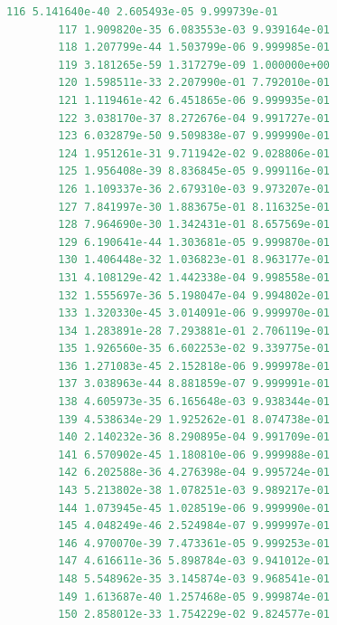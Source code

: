 \documentclass[12pt, a4paper, oneside]{ctexart}
\begin{document}
\begin{appendices}
\begin{lstlisting}[language=R, caption={训练好的模型对鸢尾花数据集的预测结果}, label=predictIris]
		116 5.141640e-40 2.605493e-05 9.999739e-01
		117 1.909820e-35 6.083553e-03 9.939164e-01
		118 1.207799e-44 1.503799e-06 9.999985e-01
		119 3.181265e-59 1.317279e-09 1.000000e+00
		120 1.598511e-33 2.207990e-01 7.792010e-01
		121 1.119461e-42 6.451865e-06 9.999935e-01
		122 3.038170e-37 8.272676e-04 9.991727e-01
		123 6.032879e-50 9.509838e-07 9.999990e-01
		124 1.951261e-31 9.711942e-02 9.028806e-01
		125 1.956408e-39 8.836845e-05 9.999116e-01
		126 1.109337e-36 2.679310e-03 9.973207e-01
		127 7.841997e-30 1.883675e-01 8.116325e-01
		128 7.964690e-30 1.342431e-01 8.657569e-01
		129 6.190641e-44 1.303681e-05 9.999870e-01
		130 1.406448e-32 1.036823e-01 8.963177e-01
		131 4.108129e-42 1.442338e-04 9.998558e-01
		132 1.555697e-36 5.198047e-04 9.994802e-01
		133 1.320330e-45 3.014091e-06 9.999970e-01
		134 1.283891e-28 7.293881e-01 2.706119e-01
		135 1.926560e-35 6.602253e-02 9.339775e-01
		136 1.271083e-45 2.152818e-06 9.999978e-01
		137 3.038963e-44 8.881859e-07 9.999991e-01
		138 4.605973e-35 6.165648e-03 9.938344e-01
		139 4.538634e-29 1.925262e-01 8.074738e-01
		140 2.140232e-36 8.290895e-04 9.991709e-01
		141 6.570902e-45 1.180810e-06 9.999988e-01
		142 6.202588e-36 4.276398e-04 9.995724e-01
		143 5.213802e-38 1.078251e-03 9.989217e-01
		144 1.073945e-45 1.028519e-06 9.999990e-01
		145 4.048249e-46 2.524984e-07 9.999997e-01
		146 4.970070e-39 7.473361e-05 9.999253e-01
		147 4.616611e-36 5.898784e-03 9.941012e-01
		148 5.548962e-35 3.145874e-03 9.968541e-01
		149 1.613687e-40 1.257468e-05 9.999874e-01
		150 2.858012e-33 1.754229e-02 9.824577e-01
		

\end{lstlisting}
\end{appendices}
\end{document}
